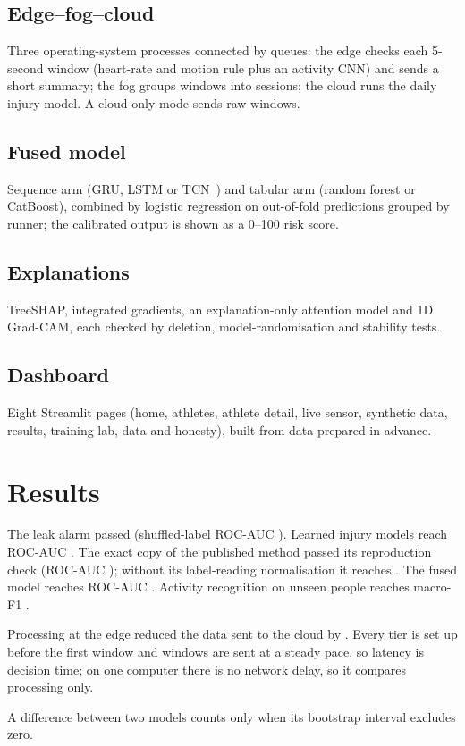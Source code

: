 \documentclass[11pt,a4paper]{report}
\begin{document}
\section{Edge--fog--cloud}
Three operating-system processes connected by queues: the edge checks each 5-second window
(heart-rate and motion rule plus an activity CNN) and sends a short summary; the fog groups
windows into sessions; the cloud runs the daily injury model. A cloud-only mode sends raw windows.
\section{Fused model}
Sequence arm (GRU, LSTM or TCN~\cite{bai2018}) and tabular arm (random forest or CatBoost),
combined by logistic regression on out-of-fold predictions grouped by runner; the calibrated
output is shown as a 0--100 risk score.
\section{Explanations}
TreeSHAP, integrated gradients, an explanation-only attention model and 1D Grad-CAM, each
checked by deletion, model-randomisation and stability tests.
\section{Dashboard}
Eight Streamlit pages (home, athletes, athlete detail, live sensor, synthetic data, results,
training lab, data and honesty), built from data prepared in advance.

\chapter{Results}

The leak alarm passed (shuffled-label ROC-AUC \canaryAuc{}). Learned injury models reach ROC-AUC
\injuryAucRange{}. The exact copy of the published method passed its reproduction check
(ROC-AUC \reproDayAuc{}); without its label-reading normalisation it reaches .
The fused model reaches ROC-AUC \fusedAuc{}. Activity recognition on unseen people reaches
macro-F1 \pamapRealFone{}.

\wesadSummary{} \augmentSummary{}

Processing at the edge reduced the data sent to the cloud by \tiersReduction{}. Every tier is
set up before the first window and windows are sent at a steady pace, so latency is decision
time; on one computer there is no network delay, so it compares processing only.

A difference between two models counts only when its bootstrap interval excludes zero.
\explainSummary{} \lockboxSummary{}
\end{document}
